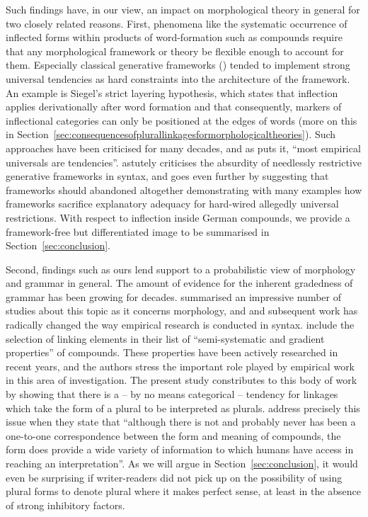 Such findings have, in our view, an impact on morphological theory in general for two closely related reasons.
First, phenomena like the systematic occurrence of inflected forms within products of word-formation such as compounds require that any morphological framework or theory be flexible enough to account for them.
Especially classical generative frameworks (\egg \citealt{Siegel1979,Mohanan1986,Anderson1992,Pinker1999}) tended to implement strong universal tendencies as hard constraints into the architecture of the framework.
An example is Siegel's strict layering hypothesis, which states that inflection applies derivationally after word formation and that consequently, markers of inflectional categories can only be positioned at the edges of words (more on this in Section~\ref{sec:consequencesofplurallinkagesformorphologicaltheories}).
Such approaches have been criticised for many decades, and as \textcite[391]{Haspelmath2010} puts it, ``most empirical universals are tendencies''.
\textcite{Pollard1996} astutely criticises the absurdity of needlessly restrictive generative frameworks in syntax, and \textcite{Haspelmath2010} goes even further by suggesting that frameworks should abandoned altogether demonstrating with many examples how frameworks sacrifice explanatory adequacy for hard-wired allegedly universal restrictions.
With respect to inflection inside German compounds, we provide a framework-free but differentiated image to be summarised in Section~\ref{sec:conclusion}.

Second, findings such as ours lend support to a probabilistic view of morphology and grammar in general.
The amount of evidence for the inherent gradedness of grammar has been growing for decades.
\textcite{HayBaayen2005} summarised an impressive number of studies about this topic as it concerns morphology, and \textcite{Bresnan2007} and subsequent work has radically changed the way empirical research is conducted in syntax.
\textcite[105]{ArndtlappeEa2016} include the selection of linking elements in their list of ``semi-systematic and gradient properties'' of compounds.
These properties have been actively researched in recent years, and the authors stress the important role played by empirical work in this area of investigation.
The present study constributes to this body of work by showing that there is a -- by no means categorical -- tendency for linkages which take the form of a plural to be interpreted as plurals.
\textcite[107]{ArndtlappeEa2016} address precisely this issue when they state that ``although there is not and probably never has been a one-to-one correspondence between the form and meaning of compounds, the form does provide a wide variety of information to which humans have access in reaching an interpretation''.
As we will argue in Section~\ref{sec:conclusion}, it would even be surprising if writer-readers did not pick up on the possibility of using plural forms to denote plural where it makes perfect sense, at least in the absence of strong inhibitory factors.

